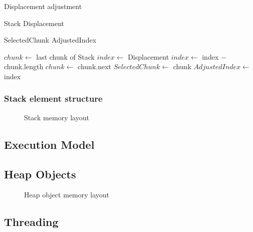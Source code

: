 \begin{algorithm}[H]
  \caption{Displacement adjustment}
  \label{algo:implementation:stack:displacement}

  \begin{algorithmic}
    \Require Stack 
    \Require Displacement 

    \Ensure SelectedChunk 
    \Ensure AdjustedIndex 

    \State $chunk\gets$ last chunk of Stack
    \State $index\gets$ Displacement
    \State $index\gets$ index $-$ chunk.length
    \State $chunk \gets$ chunk.next
    \EndWhile
    \State $SelectedChunk\gets$ chunk
    \State $AdjustedIndex\gets$ index
    \EndProcedure
  \end{algorithmic}
\end{algorithm}


\subsubsection{Stack element structure}

\begin{figure}[H]
  \centering
  
  \caption{Stack memory layout}
\end{figure}


\subsection{Execution Model}


\subsection{Heap Objects}

\begin{figure}[H]
  \centering
  
  \caption{Heap object memory layout}
\end{figure}


\subsection{Threading}


